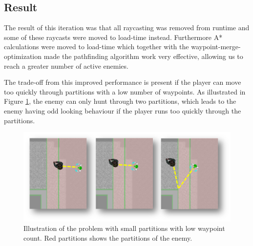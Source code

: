 \subsection*{Result}
The result of this iteration was that all raycasting was removed from runtime and some of these raycasts were moved to load-time instead.
Furthermore A* calculations were moved to load-time which together with the waypoint-merge-optimization made the pathfinding algorithm work very effective, allowing us to reach a greater number of active enemies.

The trade-off from this improved performance is present if the player can move too quickly through partitions with a low number of waypoints.
As illustrated in Figure \ref{tradeoff}, the enemy can only hunt through two partitions, which leads to the enemy having odd looking behaviour if the player runs too quickly through the partitions.
\begin{figure}[H]
        \includegraphics[width=\textwidth]{figures/astar/tradeoff.png}
    \caption{Illustration of the problem with small partitions with low waypoint count. Red partitions shows the partitions of the enemy.}\label{tradeoff}
\end{figure}